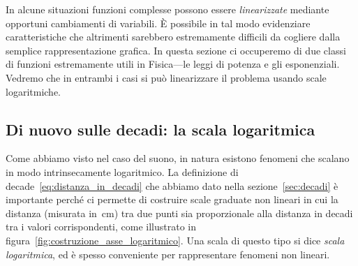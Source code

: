 
In alcune situazioni funzioni complesse possono essere \emph{linearizzate}
mediante opportuni cambiamenti di variabili. \`E possibile in tal modo
evidenziare caratteristiche che altrimenti sarebbero estremamente difficili da
cogliere dalla semplice rappresentazione grafica. In questa sezione ci
occuperemo di due classi di funzioni estremamente utili in Fisica---le leggi di
potenza e gli esponenziali. Vedremo che in entrambi i casi si può linearizzare
il problema usando scale logaritmiche.


\subsection{Di nuovo sulle decadi: la scala logaritmica}

Come abbiamo visto nel caso del suono, in natura esistono fenomeni che scalano
in modo intrinsecamente logaritmico. La definizione di decade~\eqref{eq:distanza_in_decadi}
che abbiamo dato nella sezione~\ref{sec:decadi} è importante perché ci permette di costruire
scale graduate non lineari in cui la distanza (misurata in~cm) tra due punti sia
proporzionale alla distanza in decadi tra i valori corrispondenti, come illustrato
in figura~\ref{fig:costruzione_asse_logaritmico}.
Una scala di questo tipo si dice \emph{scala logaritmica}, ed è spesso conveniente
per rappresentare fenomeni non lineari.

\begin{figure}[htb!]
\end{figure}


